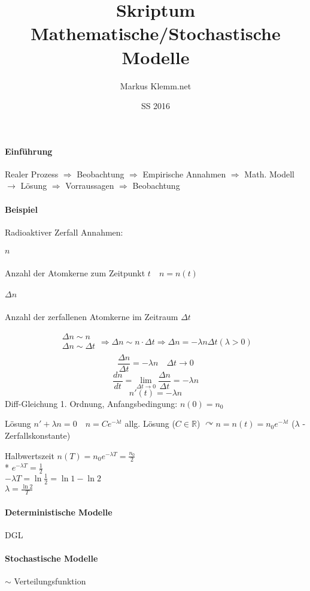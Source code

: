 \documentclass[a4paper]{scrartcl}
\title{Skriptum Mathematische/Stochastische Modelle}
\date{SS 2016}
\author{Markus Klemm.net}
\begin{document}
\maketitle

\tableofcontents

\paragraph{Einführung}
Realer Prozess $\Rightarrow$ Beobachtung $\Rightarrow$ Empirische Annahmen $\Rightarrow$ Math. Modell $\rightarrow$ Lösung $\Rightarrow$ Vorraussagen $\Rightarrow$ Beobachtung

\paragraph{Beispiel} Radioaktiver Zerfall
Annahmen:
\subparagraph{$n$} Anzahl der Atomkerne zum Zeitpunkt $t \quad n = n(t)$
\subparagraph{$\Delta n$} Anzahl der zerfallenen Atomkerne im Zeitraum $\Delta t$

\[ \begin{array}{c} \Delta n \sim n \\ \Delta n \sim \Delta t\\ \end{array} \Rightarrow \Delta n \sim n \cdot \Delta t \Rightarrow \Delta n = - \lambda n \Delta t (\lambda > 0) \]
\[ \frac{\Delta n}{\Delta t} = - \lambda n \quad \Delta t \rightarrow 0 \]
\[\frac{dn}{dt} = \lim\limits_{\Delta t \rightarrow 0} \frac{\Delta n}{\Delta t} = - \lambda n\]
\[ n' (t) = - \lambda n\]
Diff-Gleichung 1. Ordnung, Anfangsbedingung: $n(0) = n_0$

Lösung $n' + \lambda n = 0 \quad n = Ce^{-\lambda t}$ allg. Lösung ($C \in \mathbb{R}$)
$\curvearrowright n = n(t) = n_0 e^{-\lambda t}$ ($\lambda$ - Zerfallskonstante)

Halbwertszeit $n(T) = n_0 e^{-\lambda T} = \frac{n_0}{2}$\\*
$e^{-\lambda T} = \frac{1}{2}$\\
$-\lambda T = \ln{\frac{1}{2}} = \ln{1} - \ln{2}$\\
$\lambda = \frac{\ln{2}}{T}$

\paragraph{Deterministische Modelle} DGL
\paragraph{Stochastische Modelle} $\sim$ Verteilungsfunktion
\end{document}
